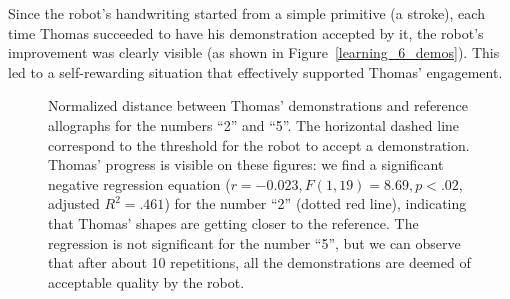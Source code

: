 \documentclass{article}
\begin{document}
Since the robot's handwriting started from a simple primitive (a stroke), each
time Thomas succeeded to have his demonstration accepted by it, the robot's
improvement was clearly visible (as shown in Figure~\ref{learning_6_demos}).
This led to a self-rewarding situation that effectively supported Thomas'
engagement.

\begin{figure}
    \centering
    \caption{\small Normalized distance between Thomas' demonstrations and
        reference allographs for the numbers ``2'' and ``5''. The horizontal
        dashed line correspond to the threshold for the robot to accept a
        demonstration. Thomas' progress is visible on these figures: we find a
        significant negative regression equation ($r=-0.023, F(1,19)=8.69,
        p<.02$, adjusted $R^2=.461$) for the number ``2'' (dotted red line),
        indicating that Thomas' shapes are getting closer to the reference. The
        regression is not significant for the number ``5'', but we can observe
        that after about 10 repetitions, all the demonstrations are deemed of
        acceptable quality by the robot.  }

    \label{Thomas_progress}
\end{figure}



\end{document}
